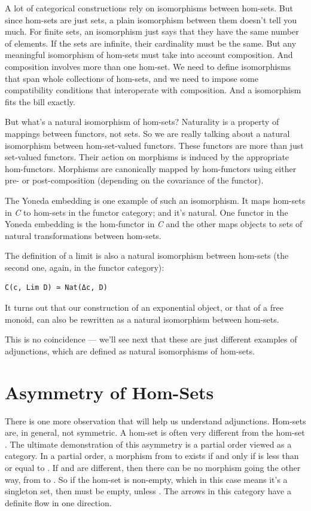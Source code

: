 A lot of categorical constructions rely on isomorphisms between
hom-sets. But since hom-sets are just sets, a plain isomorphism between
them doesn't tell you much. For finite sets, an isomorphism just says
that they have the same number of elements. If the sets are infinite,
their cardinality must be the same. But any meaningful isomorphism of
hom-sets must take into account composition. And composition involves
more than one hom-set. We need to define isomorphisms that span whole
collections of hom-sets, and we need to impose some compatibility
conditions that interoperate with composition. And a 
isomorphism fits the bill exactly.

But what's a natural isomorphism of hom-sets? Naturality is a property
of mappings between functors, not sets. So we are really talking about a
natural isomorphism between hom-set-valued functors. These functors are
more than just set-valued functors. Their action on morphisms is induced
by the appropriate hom-functors. Morphisms are canonically mapped by
hom-functors using either pre- or post-composition (depending on the
covariance of the functor).

The Yoneda embedding is one example of such an isomorphism. It maps
hom-sets in \emph{C} to hom-sets in the functor category; and it's
natural. One functor in the Yoneda embedding is the hom-functor in
\emph{C} and the other maps objects to sets of natural transformations
between hom-sets.

The definition of a limit is also a natural isomorphism between hom-sets
(the second one, again, in the functor category):

\begin{verbatim}
C(c, Lim D) ≃ Nat(Δc, D)
\end{verbatim}

It turns out that our construction of an exponential object, or that of
a free monoid, can also be rewritten as a natural isomorphism between
hom-sets.

This is no coincidence --- we'll see next that these are just different
examples of adjunctions, which are defined as natural isomorphisms of
hom-sets.

\section{Asymmetry of Hom-Sets}\label{asymmetry-of-hom-sets}

There is one more observation that will help us understand adjunctions.
Hom-sets are, in general, not symmetric. A hom-set  is
often very different from the hom-set . The ultimate
demonstration of this asymmetry is a partial order viewed as a category.
In a partial order, a morphism from  to  exists if
and only if  is less than or equal to . If
 and  are different, then there can be no morphism
going the other way, from  to . So if the hom-set
 is non-empty, which in this case means it's a
singleton set, then  must be empty, unless
. The arrows in this category have a definite flow in
one direction.

